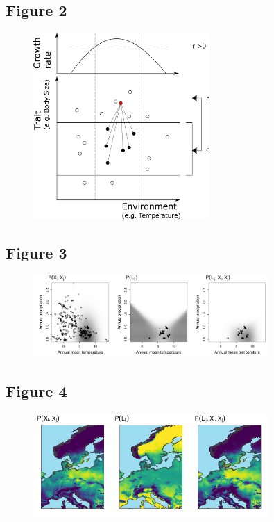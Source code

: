 \documentclass[12pt]{article}
\begin{document}
\newpage

\subsection*{Figure 2}

\begin{figure}[ht!]
\centering\includegraphics[width=0.6\textwidth]{figures/integrated_niche.png}
\end{figure}

\newpage

\subsection*{Figure 3}

\begin{figure}[ht!]
\centering\includegraphics[width=0.8\textwidth]{figures/example_pair.png}
\end{figure}

\newpage

\subsection*{Figure 4}

\begin{figure}[ht!]
\centering\includegraphics[width=0.8\textwidth]{figures/map_pair.png}
\end{figure}
\end{document}
